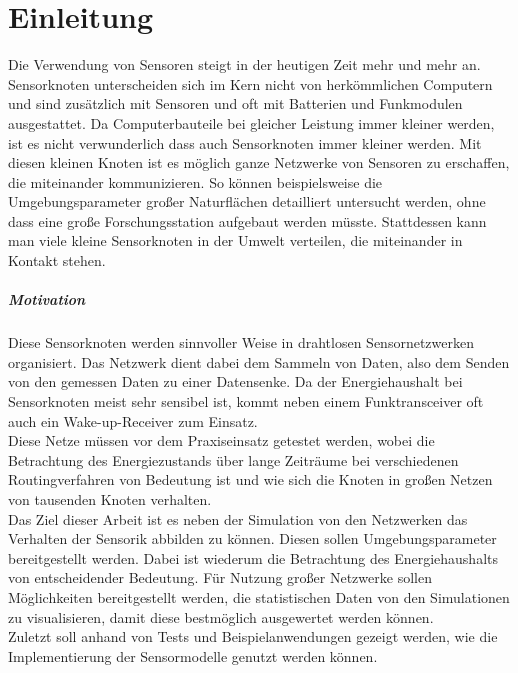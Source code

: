 \chapter{Einleitung}

Die Verwendung von Sensoren steigt in der heutigen Zeit mehr und mehr an. Sensorknoten unterscheiden sich im Kern nicht von herkömmlichen Computern und sind zusätzlich mit Sensoren und oft mit Batterien und Funkmodulen ausgestattet. Da Computerbauteile bei gleicher Leistung immer kleiner werden, ist es nicht verwunderlich dass auch Sensorknoten immer kleiner werden. Mit diesen kleinen Knoten ist es möglich ganze Netzwerke von Sensoren zu erschaffen, die miteinander kommunizieren. So können beispielsweise die Umgebungsparameter großer Naturflächen detailliert untersucht werden, ohne dass eine große Forschungsstation aufgebaut werden müsste. Stattdessen kann man viele kleine Sensorknoten in der Umwelt verteilen, die miteinander in Kontakt stehen.
\paragraph{Motivation}
Diese Sensorknoten werden sinnvoller Weise in drahtlosen Sensornetzwerken organisiert. Das Netzwerk dient dabei dem Sammeln von Daten, also dem Senden von den gemessen Daten zu einer Datensenke. Da der Energiehaushalt bei Sensorknoten meist sehr sensibel ist, kommt neben einem Funktransceiver oft auch ein Wake-up-Receiver zum Einsatz.\\
Diese Netze müssen vor dem Praxiseinsatz getestet werden, wobei die Betrachtung des Energiezustands über lange Zeiträume bei verschiedenen Routingverfahren von Bedeutung ist und wie sich die Knoten in großen Netzen von tausenden Knoten verhalten.\\
Das Ziel dieser Arbeit ist es neben der Simulation von den Netzwerken das Verhalten der Sensorik abbilden zu können. Diesen sollen Umgebungsparameter bereitgestellt werden. Dabei ist wiederum die Betrachtung des Energiehaushalts von entscheidender Bedeutung. Für Nutzung großer Netzwerke sollen Möglichkeiten bereitgestellt werden, die statistischen Daten von den Simulationen zu visualisieren, damit diese bestmöglich ausgewertet werden können.\\
Zuletzt soll anhand von Tests und Beispielanwendungen gezeigt werden, wie die Implementierung der Sensormodelle genutzt werden können.